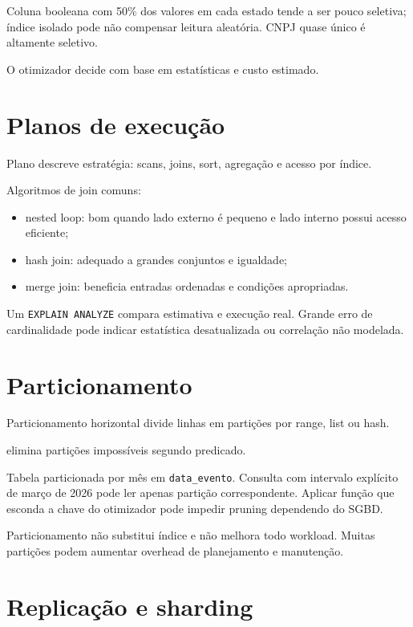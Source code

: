 Coluna booleana com 50\% dos valores em cada estado tende a ser pouco seletiva; índice isolado pode não compensar leitura aleatória. CNPJ quase único é altamente seletivo.

O otimizador decide com base em estatísticas e custo estimado.

\section{Planos de execução}

Plano descreve estratégia: scans, joins, sort, agregação e acesso por índice.

Algoritmos de join comuns:
\begin{itemize}
\item nested loop: bom quando lado externo é pequeno e lado interno possui acesso eficiente;
\item hash join: adequado a grandes conjuntos e igualdade;
\item merge join: beneficia entradas ordenadas e condições apropriadas.
\end{itemize}

Um \texttt{EXPLAIN ANALYZE} compara estimativa e execução real. Grande erro de cardinalidade pode indicar estatística desatualizada ou correlação não modelada.

\section{Particionamento}

Particionamento horizontal divide linhas em partições por range, list ou hash.

 elimina partições impossíveis segundo predicado.

\begin{exemplo}
Tabela particionada por mês em \texttt{data_evento}. Consulta com intervalo explícito de março de 2026 pode ler apenas partição correspondente. Aplicar função que esconda a chave do otimizador pode impedir pruning dependendo do SGBD.
\end{exemplo}

Particionamento não substitui índice e não melhora todo workload. Muitas partições podem aumentar overhead de planejamento e manutenção.

\section{Replicação e sharding}

